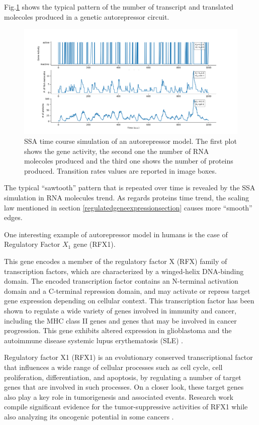 \documentclass[12pt,a4paper]{report}
\begin{document}
Fig.\ref{autorepressortimeplot} shows the typical pattern of the number of transcript and translated molecoles produced in a genetic autorepressor circuit.

\begin{figure}[!ht]
\hspace*{-2.5cm} 
\includegraphics[scale=0.59]{autorepressortimeplotaugeneactivity.png}
\caption{SSA time course simulation of an autorepressor model. The first plot shows the gene activity, the second one the number of RNA molecoles produced and the third one shows the number of proteins produced. Transition rates values are reported in image boxes.}
\label{autorepressortimeplot}
\end{figure}
\newpage
The typical ``sawtooth'' pattern that is repeated over time is revealed by the SSA simulation in RNA molecules trend. As regards proteins time trend, the scaling law mentioned in section \ref{regulatedgeneexpressionsection} causes more ``smooth'' edges. 

One interesting example of autorepressor model in humans is the case of Regulatory Factor $X_{1}$ gene (RFX1).

This gene encodes a member of the regulatory factor X (RFX) family of transcription factors, which are characterized by a winged-helix DNA-binding domain. The encoded transcription factor contains an N-terminal activation domain and a C-terminal repression domain, and may activate or repress target gene expression depending on cellular context. This transcription factor has been shown to regulate a wide variety of genes involved in immunity and cancer, including the MHC class II genes and genes that may be involved in cancer progression. This gene exhibits altered expression in glioblastoma and the autoimmune disease systemic lupus erythematosis (SLE) \cite{RFX1Gene}.

Regulatory factor X1 (RFX1) is an evolutionary conserved transcriptional factor that influences a wide range of cellular processes such as cell cycle, cell proliferation, differentiation, and apoptosis, by regulating a number of target genes that are involved in such processes. On a closer look, these target genes also play a key role in tumorigenesis and associated events. Research work compile significant evidence for the tumor-suppressive activities of RFX1 while also analyzing its oncogenic potential in some cancers \cite{RFX1ArsenalAgainstCancer}.
\end{document}
